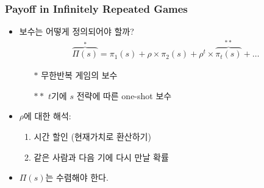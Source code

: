 \documentclass[final]{beamer}
\begin{document}
\begin{frame}\frametitle{Payoff in Infinitely Repeated Games}\vspace{.5em}
\begin{itemize}
	\item 보수는 어떻게 정의되어야 할까? 
%
\begin{align*}
\overbrace{\Pi(s)}^{\ast}=\pi_1 (s) + \rho \times \pi_2 (s) + \rho^t \times \overbrace{\pi_t (s)}^{\ast\ast} + \ldots 
\end{align*}
%

	\begin{itemize}
		\item[$\ast$] 무한반복 게임의 보수 
		\item[$\ast\ast$] $t$기에 $s$ 전략에 따른 one-shot 보수 
	\end{itemize}

	\item $\rho$에 대한 해석: 

	\begin{enumerate}
		\item 시간 할인 (현재가치로 환산하기) 
		\item 같은 사람과 다음 기에 다시 만날 확률 
	\end{enumerate}

	\item $\Pi(s)$는 수렴해야 한다. 
	
\end{itemize}
\end{frame}
\end{document}

